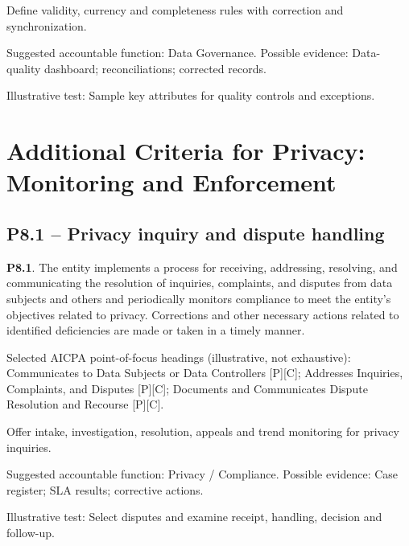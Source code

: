 \documentclass[10pt,oneside]{report}
\begin{document}
\begin{engineeringbox}
Define validity, currency and completeness rules with correction and synchronization.
\end{engineeringbox}
Suggested accountable function: Data Governance. Possible evidence: Data-quality dashboard; reconciliations; corrected records.

Illustrative test: Sample key attributes for quality controls and exceptions.

\section{Additional Criteria for Privacy: Monitoring and Enforcement}
\subsection*{P8.1 -- Privacy inquiry and dispute handling}
\begin{aicpabox}
\textbf{P8.1}. The entity implements a process for receiving, addressing, resolving, and communicating the resolution of inquiries, complaints, and disputes from data subjects and others and periodically monitors compliance to meet the entity's objectives related to privacy. Corrections and other necessary actions related to identified deficiencies are made or taken in a timely manner.\par{}
\end{aicpabox}
Selected AICPA point-of-focus headings (illustrative, not exhaustive): Communicates to Data Subjects or Data Controllers [P][C]; Addresses Inquiries, Complaints, and Disputes [P][C]; Documents and Communicates Dispute Resolution and Recourse [P][C].

\begin{engineeringbox}
Offer intake, investigation, resolution, appeals and trend monitoring for privacy inquiries.
\end{engineeringbox}
Suggested accountable function: Privacy / Compliance. Possible evidence: Case register; SLA results; corrective actions.

Illustrative test: Select disputes and examine receipt, handling, decision and follow-up.
\end{document}
